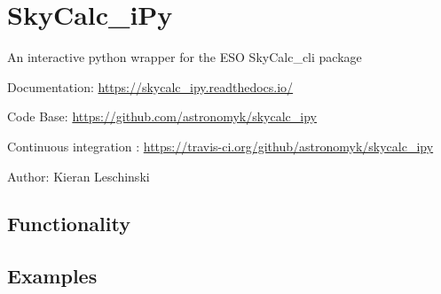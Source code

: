 

\section{SkyCalc\_iPy%
  \label{skycalc-ipy}%
}

An interactive python wrapper for the ESO SkyCalc\_cli package

Documentation: \url{https://skycalc_ipy.readthedocs.io/}

Code Base: \url{https://github.com/astronomyk/skycalc_ipy}

Continuous integration : \url{https://travis-ci.org/github/astronomyk/skycalc_ipy}

Author: Kieran Leschinski


\subsection{Functionality%
  \label{functionality}%
}


\subsection{Examples%
  \label{examples}%
}
